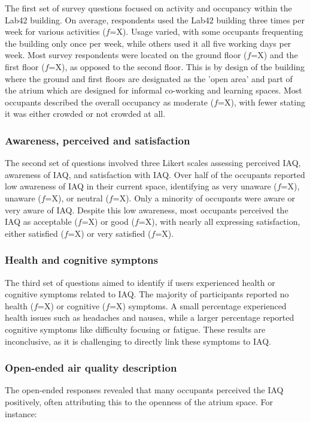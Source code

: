 The first set of survey questions focused on activity and occupancy within the Lab42 building. On average, respondents used the Lab42 building three times per week for various activities ($f$=X). Usage varied, with some occupants frequenting the building only once per week, while others used it all five working days per week. Most survey respondents were located on the ground floor ($f$=X) and the first floor ($f$=X), as opposed to the second floor. This is by design of the building where the ground and first floors are designated as the 'open area' and part of the atrium which are designed for informal co-working and learning spaces. Most occupants described the overall occupancy as moderate ($f$=X), with fewer stating it was either crowded or not crowded at all.

\subsubsection{Awareness, perceived and satisfaction}

The second set of questions involved three Likert scales assessing perceived IAQ, awareness of IAQ, and satisfaction with IAQ. Over half of the occupants reported low awareness of IAQ in their current space, identifying as very unaware ($f$=X), unaware ($f$=X), or neutral ($f$=X). Only a minority of occupants were aware or very aware of IAQ. Despite this low awareness, most occupants perceived the IAQ as acceptable ($f$=X) or good ($f$=X), with nearly all expressing satisfaction, either satisfied ($f$=X) or very satisfied ($f$=X).


\subsubsection{Health and cognitive symptons}

The third set of questions aimed to identify if users experienced health or cognitive symptoms related to IAQ. The majority of participants reported no health ($f$=X) or cognitive ($f$=X) symptoms. A small percentage experienced health issues such as headaches and nausea, while a larger percentage reported cognitive symptoms like difficulty focusing or fatigue. These results are inconclusive, as it is challenging to directly link these symptoms to IAQ.

\subsubsection{Open-ended air quality description}
The open-ended responses revealed that many occupants perceived the IAQ positively, often attributing this to the openness of the atrium space. For instance:

